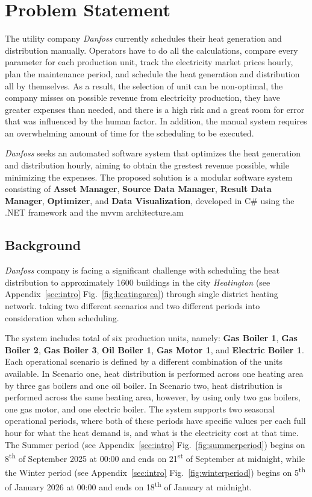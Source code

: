 \section{Problem Statement}
The utility company \textit{Danfoss} currently schedules their heat generation and distribution manually.
Operators have to do all the calculations, compare every parameter for each production unit,
track the electricity market prices hourly, plan the maintenance period, and schedule the heat
generation and distribution all by themselves. As a result, the selection of unit can be non-optimal,
the company misses on possible revenue from electricity production, they have greater expenses than needed,
and there is a high risk and a great room for error that was influenced by the human factor.
In addition, the manual system requires an overwhelming amount of time for the scheduling to be executed.

\textit{Danfoss} seeks an automated software system that optimizes the heat generation and distribution hourly,
aiming to obtain the grestest revenue possible, while minimizing the expenses. The proposed solution is a
modular software system consisting of \textbf{Asset Manager}, \textbf{Source Data Manager}, \textbf{Result Data Manager},
\textbf{Optimizer}, and \textbf{Data Visualization}, developed in C\# using the .NET framework and the \acrshort{mvvm} architecture.\acrfull{am}

\subsection{Background}
\textit{Danfoss} company is facing a significant challenge with scheduling the heat distribution to
approximately 1600 buildings in the city \textit{Heatington} (see Appendix~\ref{sec:intro}  Fig.~\ref{fig:heatingarea}) through single district heating network. taking
two different scenarios and two different periods into consideration when scheduling.


\vspace{0.5cm}

\noindent The system includes total of six production units, namely: \textbf{Gas Boiler 1}, \textbf{Gas Boiler 2}, \textbf{Gas Boiler 3},
\textbf{Oil Boiler 1}, \textbf{Gas Motor 1}, and \textbf{Electric Boiler 1}. Each operational scenario is defined by a different combination of the units available.
In Scenario one, heat distribution is performed across one heating area by three gas boilers
and one oil boiler. In Scenario two, heat distribution is performed across the same heating area, however, by using
only two gas boilers, one gas motor, and one electric boiler. The system supports two seasonal operational periods, where both
of these periods have specific values per each full hour for what the heat demand is, and what is the electricity cost at that time.
The Summer period (see Appendix~\ref{sec:intro}  Fig.~\ref{fig:summerperiod}) begins on 8\textsuperscript{th} of September 2025 at 00:00 and ends on 21\textsuperscript{st}
of September at midnight, while the Winter period (see Appendix~\ref{sec:intro}  Fig.~\ref{fig:winterperiod}) begins on 5\textsuperscript{th} of January 2026 at 00:00 and ends on
18\textsuperscript{th} of January at midnight.

